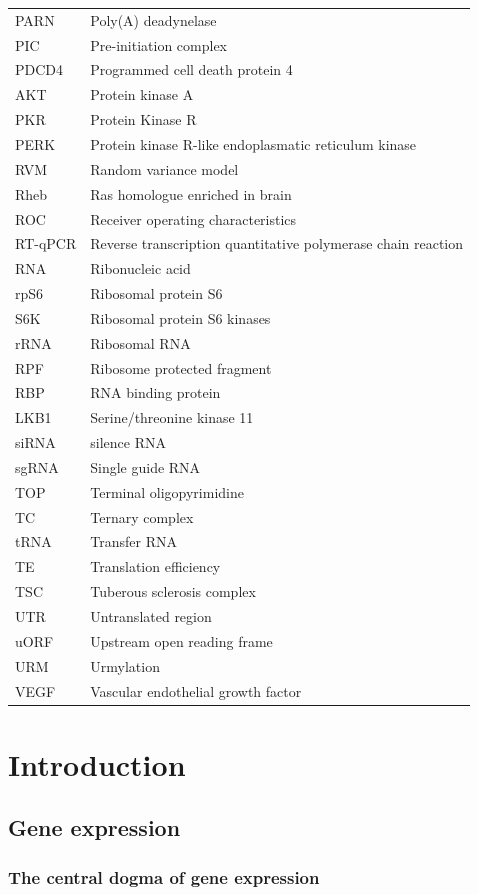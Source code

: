 \documentclass[12pt,openany]{book}
\begin{document}
\begin{longtable}{ll}
PARN & Poly(A) deadynelase\\
PIC & Pre-initiation complex\\
PDCD4 & Programmed cell death protein 4\\
AKT & Protein kinase A\\
\addlinespace
PKR & Protein Kinase R\\
PERK & Protein kinase R-like endoplasmatic reticulum kinase\\
RVM & Random variance model\\
Rheb & Ras homologue enriched in brain\\
ROC & Receiver operating characteristics\\
\addlinespace
RT-qPCR & Reverse transcription quantitative polymerase chain
reaction\\
RNA & Ribonucleic acid\\
rpS6 & Ribosomal protein S6\\
S6K & Ribosomal protein S6 kinases\\
rRNA & Ribosomal RNA\\
\addlinespace
RPF & Ribosome protected fragment\\
RBP & RNA binding protein\\
LKB1 & Serine/threonine kinase 11\\
siRNA & silence RNA\\
sgRNA & Single guide RNA\\
\addlinespace
TOP & Terminal oligopyrimidine\\
TC & Ternary complex\\
tRNA & Transfer RNA\\
TE & Translation efficiency\\
TSC & Tuberous sclerosis complex\\
\addlinespace
UTR & Untranslated region\\
uORF & Upstream open reading frame\\
URM & Urmylation\\
VEGF & Vascular endothelial growth factor\\*
\end{longtable}

\clearpage
{} \setcounter{page}{1}

\chapter{Introduction}\section{Gene expression}\subsection{The central dogma of gene expression}
\end{document}
